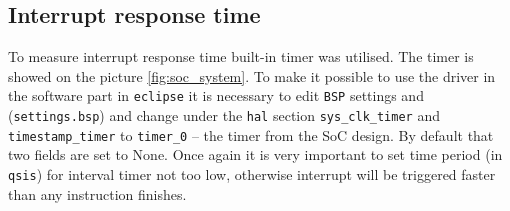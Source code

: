 \subsection{Interrupt response time}
To measure interrupt response time built-in timer was utilised. The timer is showed on the picture \ref{fig:soc_system}. To make it possible to use the driver in the software part in \verb|eclipse| it is necessary to edit \verb|BSP| settings and (\verb|settings.bsp|) and change under the \verb|hal| section \verb|sys_clk_timer| and \verb|timestamp_timer| to \verb|timer_0| -- the timer from the SoC design. By default that two fields are set to None. Once again it is very important to set time period (in \verb|qsis|) for interval timer not too low, otherwise interrupt will be triggered faster than any instruction finishes. 

